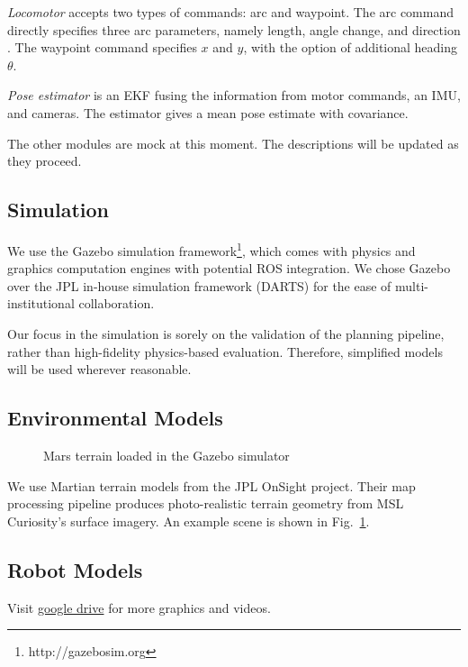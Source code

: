 \documentclass[conference]{IEEEtran}
\begin{document}
\textit{Locomotor} accepts two types of commands: arc and waypoint. The arc command directly specifies three arc parameters, namely length, angle change, and direction . The waypoint command specifies $x$ and $y$, with the option of additional heading $\theta$. 

\textit{Pose estimator} is an EKF fusing the information from motor commands, an IMU, and cameras. The estimator gives a mean pose estimate with covariance.


The other modules are mock at this moment. The descriptions will be updated as they proceed. 




\subsection{Simulation}

We use the Gazebo simulation framework\footnote{http://gazebosim.org}, which comes with physics and graphics computation engines with potential ROS integration. We chose Gazebo over the JPL in-house simulation framework (DARTS) for the ease of multi-institutional collaboration. 

Our focus in the simulation is sorely on the validation of the planning pipeline, rather than high-fidelity physics-based evaluation. Therefore, simplified models will be used wherever reasonable.

\subsection{Environmental Models}

\begin{figure}
    \centering
    \caption{Mars terrain loaded in the Gazebo simulator}
    \label{fig:gazebo_scene}
\end{figure}

We use Martian terrain models from the JPL OnSight project. Their map processing pipeline produces photo-realistic terrain geometry from MSL Curiosity's surface imagery. An example scene is shown in Fig.~\ref{fig:gazebo_scene}.

\subsection{Robot Models}

Visit \href{https://drive.google.com/open?id=11q2FOfptd6fleQsyj000xp1wX_B7e4W1}{google drive} for more graphics and videos. 
\end{document}
